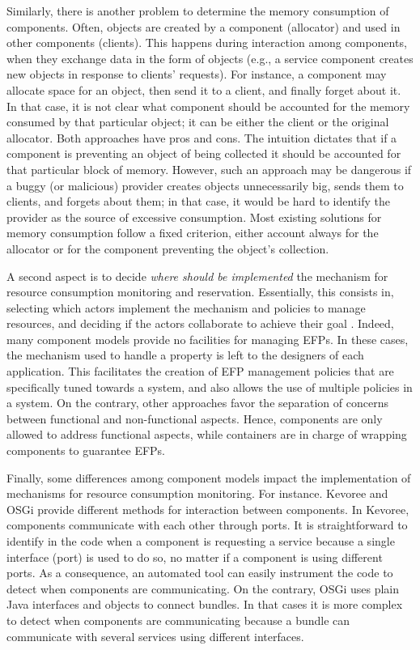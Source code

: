 Similarly, there is another problem to determine the memory consumption of components.
Often, objects are created by a component (allocator) and used in other components (clients).
This happens during interaction among components, when they exchange data in the form of objects (e.g., a service component creates new objects in response to clients' requests).
For instance, a component may allocate space for an object, then send it to a client, and finally forget about it.
In that case, it is not clear what component should be accounted for the memory consumed by that particular object; it can be either the client or the original allocator.
Both approaches have pros and cons.
The intuition dictates that if a component is preventing an object of being collected it should be accounted for that particular block of memory.
However, such an approach may be dangerous if a buggy (or malicious) provider creates objects unnecessarily big, sends them to clients, and forgets about them; in that case, it would be hard to identify the provider as the source of excessive consumption. 
Most existing solutions for memory consumption follow a fixed criterion, either account always for the allocator or for the component preventing the object's collection.

A second aspect is to decide \textit{where should be implemented} the mechanism for resource consumption monitoring and reservation.
Essentially, this consists in, selecting which actors implement the mechanism and policies to manage resources, and deciding if the actors collaborate to achieve their goal \cite{Crnkovic2011}.
Indeed, many component models provide no facilities for managing \glspl{EFP}.
In these cases, the mechanism used to handle a property is left to the designers of each application.
This facilitates the creation of EFP management policies that are specifically tuned towards a system, and also allows the use of multiple policies in a system.
On the contrary, other approaches favor the separation of concerns between functional and non-functional aspects.
Hence, components are only allowed to address functional aspects, while containers are in charge of wrapping components to guarantee EFPs.

Finally, some differences among component models impact the implementation of mechanisms for resource consumption monitoring.
For instance. Kevoree and OSGi provide different methods for interaction between components.
In Kevoree, components communicate with each other through ports.
It is straightforward to identify in the code when a component is requesting a service because a single interface (port) is used to do so, no matter if a component is using different ports. 
As a consequence, an automated tool can easily instrument the code to detect when components are communicating.
On the contrary, OSGi uses plain Java interfaces and objects to connect bundles.
In that cases it is more complex to detect when components are communicating because a bundle can communicate with several services using different interfaces. 


